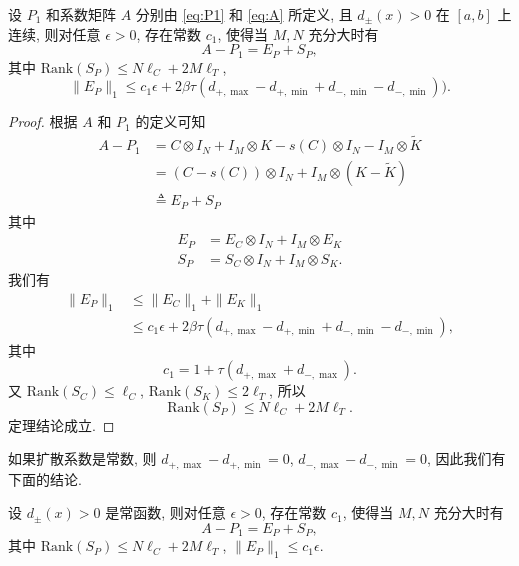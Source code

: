 \documentclass{ecnumaster}
\begin{document}
\begin{theorem}
  设 $P_1$ 和系数矩阵 $A$ 分别由 \eqref{eq:P1} 和 \eqref{eq:A} 所定义,
  且 $d_{\pm}(x)>0$ 在 $[a,b]$ 上连续, 
  则对任意 $\epsilon>0$, 存在常数 $c_1$, 使得当 $M,N$ 充分大时有
  $$ A - P_1 = E_P + S_P,$$
  其中 $\mathrm{Rank}(S_P)\leq N\ell_C + 2M\ell_T$,
  $$ \|E_P\|_1 \leq c_1 \epsilon + 2 \beta \tau (d_{+, \max} - d_{+, \min} + d_{-, \min} - d_{-, \min})).
  $$
\end{theorem}
\begin{proof}
  根据 $A$ 和 $P_1$ 的定义可知
  \begin{align*}
    A - P_1
    & = C \otimes I_N + I_M \otimes K - s(C) \otimes I_N - I_M \otimes \tilde{K}\\
    & = (C - s(C)) \otimes I_N + I_M \otimes (K - \tilde{K})\\
    & \triangleq E_P + S_P    
  \end{align*}
  其中 
  \begin{align*}
     E_P & = E_C \otimes I_N + I_M \otimes E_K \\
     S_P & = S_C \otimes I_N + I_M \otimes S_K.
   \end{align*}
   我们有
   \begin{align*}
     \|E_P\|_1 
     & \leq \| E_C \|_1 + \| E_K \|_1 \\
     & \leq c_1 \epsilon + 2 \beta \tau (d_{+, \max} - d_{+, \min} + d_{-, \min} - d_{-, \min}),
   \end{align*}   
   其中
   $$
     c_1  = 1 + \tau (d_{+, \max} + d_{-, \max}).
   $$
   又 $\mathrm{Rank}(S_C)\leq \ell_C$, $\mathrm{Rank}(S_K)\leq 2\ell_T$, 所以
   $$ \mathrm{Rank}(S_P)\leq N\ell_C + 2M\ell_T.$$
   定理结论成立.
\end{proof}

如果扩散系数是常数, 则 $d_{+,\max}-d_{+,\min}=0$, $d_{-,\max}-d_{-,\min}=0$,
因此我们有下面的结论.
\begin{corollary} 
  设 $d_{\pm}(x)>0$ 是常函数, 则对任意 $\epsilon>0$, 存在常数 $c_1$, 使得当 $M,N$ 充分大时有
  $$ A - P_1 = E_P + S_P,$$
  其中 $\mathrm{Rank}(S_P)\leq N\ell_C + 2M\ell_T$,
  $ \|E_P\|_1 \leq c_1 \epsilon. $
\end{corollary}
\end{document}

